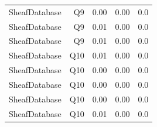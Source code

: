 \begin{table}[htbp]
\begin{tabular}{lrrrr}
SheafDatabase & Q9 & 0.00 & 0.00 & 0.0 \\
SheafDatabase & Q9 & 0.01 & 0.00 & 0.0 \\
SheafDatabase & Q9 & 0.01 & 0.00 & 0.0 \\
SheafDatabase & Q10 & 0.01 & 0.00 & 0.0 \\
SheafDatabase & Q10 & 0.00 & 0.00 & 0.0 \\
SheafDatabase & Q10 & 0.00 & 0.00 & 0.0 \\
SheafDatabase & Q10 & 0.00 & 0.00 & 0.0 \\
SheafDatabase & Q10 & 0.01 & 0.00 & 0.0 \\
\bottomrule
\end{tabular}
\end{table}

